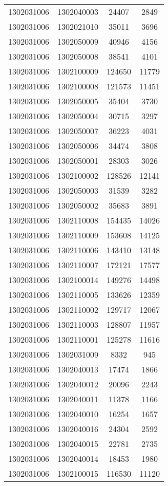 \begin{longtable}[h]{llcc}
		1302031006 & 1302040003 & 24407 & 2849\\
		1302031006 & 1302021010 & 35011 & 3696\\
		1302031006 & 1302050009 & 40946 & 4156\\
		1302031006 & 1302050008 & 38541 & 4101\\
		1302031006 & 1302100009 & 124650 & 11779\\
		1302031006 & 1302100008 & 121573 & 11451\\
		1302031006 & 1302050005 & 35404 & 3730\\
		1302031006 & 1302050004 & 30715 & 3297\\
		1302031006 & 1302050007 & 36223 & 4031\\
		1302031006 & 1302050006 & 34474 & 3808\\
		1302031006 & 1302050001 & 28303 & 3026\\
		1302031006 & 1302100002 & 128526 & 12141\\
		1302031006 & 1302050003 & 31539 & 3282\\
		1302031006 & 1302050002 & 35683 & 3891\\
		1302031006 & 1302110008 & 154435 & 14026\\
		1302031006 & 1302110009 & 153608 & 14125\\
		1302031006 & 1302110006 & 143410 & 13148\\
		1302031006 & 1302110007 & 172121 & 17577\\
		1302031006 & 1302100014 & 149276 & 14498\\
		1302031006 & 1302110005 & 133626 & 12359\\
		1302031006 & 1302110002 & 129717 & 12067\\
		1302031006 & 1302110003 & 128807 & 11957\\
		1302031006 & 1302110001 & 125278 & 11616\\
		1302031006 & 1302031009 & 8332 & 945\\
		1302031006 & 1302040013 & 17474 & 1866\\
		1302031006 & 1302040012 & 20096 & 2243\\
		1302031006 & 1302040011 & 11378 & 1166\\
		1302031006 & 1302040010 & 16254 & 1657\\
		1302031006 & 1302040016 & 24304 & 2592\\
		1302031006 & 1302040015 & 22781 & 2735\\
		1302031006 & 1302040014 & 18453 & 1980\\
		1302031006 & 1302100015 & 116530 & 11120\\

\end{longtable}
